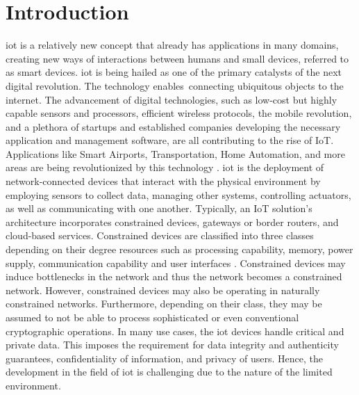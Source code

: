 \chapter{Introduction}
\label{ch:introduction}

\gls{iot} is a relatively new concept that already has applications in many domains, creating new ways of interactions between humans and small devices, referred to as smart devices. \gls{iot} is being hailed as one of the primary catalysts of the next digital revolution. The technology enables connecting ubiquitous objects to the internet. The advancement of digital technologies, such as low-cost but highly capable sensors and processors, efficient wireless protocols, the mobile revolution, and a plethora of startups and established companies developing the necessary application and management software, are all contributing to the rise of IoT.
Applications like Smart Airports, Transportation, Home Automation, and more areas are being revolutionized by this technology \cite{marksteiner2017overview}.
\gls{iot} is the deployment of network-connected devices that interact with the physical environment by employing sensors to collect data, managing other systems, controlling actuators, as well as communicating with one another. Typically, an IoT solution's architecture incorporates constrained devices, gateways or border routers, and cloud-based services. Constrained devices are classified into three classes depending on their degree resources such as processing capability, memory, power supply, communication capability and user interfaces \cite{rfc7228}. Constrained devices may induce bottlenecks in the network and thus the network becomes a constrained network. However, constrained devices may also be operating in naturally constrained networks. Furthermore, depending on their class, they may be assumed to not be able to process sophisticated or even conventional cryptographic operations. In many use cases, the \gls{iot} devices handle critical and private data. This imposes the requirement for data integrity and authenticity guarantees, confidentiality of information, and privacy of users. Hence, the development in the field of \gls{iot} is challenging due to the nature of the limited environment.
\par

